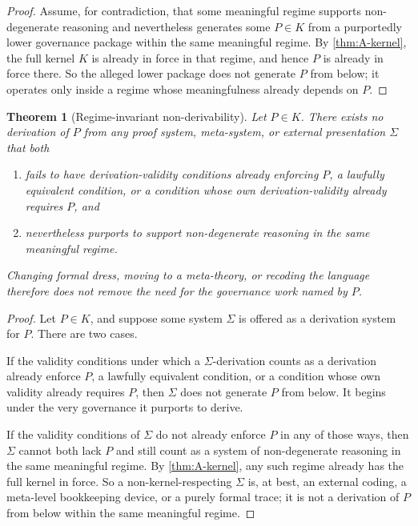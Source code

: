 \documentclass[11pt]{article}
\theoremstyle{plain}
\newtheorem{theorem}{Theorem}[section]
\theoremstyle{definition}
\begin{document}
\begin{proof}
Assume, for contradiction, that some meaningful regime supports non-degenerate reasoning and nevertheless generates some $P\in K$ from a purportedly lower governance package within the same meaningful regime. By \cref{thm:A-kernel}, the full kernel $K$ is already in force in that regime, and hence $P$ is already in force there. So the alleged lower package does not generate $P$ from below; it operates only inside a regime whose meaningfulness already depends on $P$.
\end{proof}

\begin{theorem}[Regime-invariant non-derivability]
\label{thm:A-regime-invariant}
Let $P\in K$. There exists no derivation of $P$ from any proof system, meta-system, or external presentation $\Sigma$ that both
\begin{enumerate}[label=(\roman*), leftmargin=2.5em]
    \item fails to have derivation-validity conditions already enforcing $P$, a lawfully equivalent condition, or a condition whose own derivation-validity already requires $P$, and
    \item nevertheless purports to support non-degenerate reasoning in the same meaningful regime.
\end{enumerate}
Changing formal dress, moving to a meta-theory, or recoding the language therefore does not remove the need for the governance work named by $P$.
\end{theorem}

\begin{proof}
Let $P\in K$, and suppose some system $\Sigma$ is offered as a derivation system for $P$. There are two cases.

If the validity conditions under which a $\Sigma$-derivation counts as a derivation already enforce $P$, a lawfully equivalent condition, or a condition whose own validity already requires $P$, then $\Sigma$ does not generate $P$ from below. It begins under the very governance it purports to derive.

If the validity conditions of $\Sigma$ do not already enforce $P$ in any of those ways, then $\Sigma$ cannot both lack $P$ and still count as a system of non-degenerate reasoning in the same meaningful regime. By \cref{thm:A-kernel}, any such regime already has the full kernel in force. So a non-kernel-respecting $\Sigma$ is, at best, an external coding, a meta-level bookkeeping device, or a purely formal trace; it is not a derivation of $P$ from below within the same meaningful regime.
\end{proof}
\end{document}
